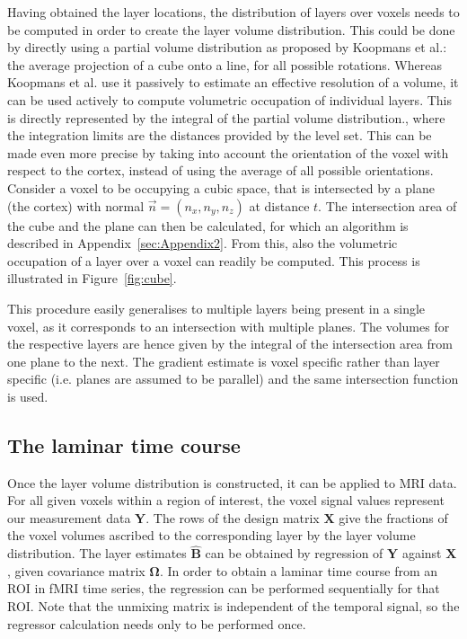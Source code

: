 Having obtained the layer locations, the distribution of layers over voxels needs to be computed in order to create the layer volume distribution. This could be done by directly using a partial volume distribution as proposed by Koopmans et al.\cite{Koopmans2011}: the average projection of a cube onto a line, for all possible rotations. Whereas Koopmans et al. \cite{Koopmans2011} use it passively to estimate an effective resolution of a volume, it can be used actively to compute volumetric occupation of individual layers. This is directly represented by the integral of the partial volume distribution., where the integration limits are the distances provided by the level set. This can be made even more precise by taking into account the orientation of the voxel with respect to the cortex, instead of using the average of all possible orientations. Consider a voxel to be occupying a cubic space, that is intersected by a plane (the cortex) with normal $\vec{n}=(n_x, n_y, n_z)$ at distance $t$. The intersection area of the cube and the plane can then be calculated, for which an algorithm is described in Appendix~\ref{sec:Appendix2}. From this, also the volumetric occupation of a layer over a voxel can readily be computed. This process is illustrated in Figure~\ref{fig:cube}.

This procedure easily generalises to multiple layers being present in a single voxel, as it corresponds to an intersection with multiple planes. The volumes for the respective layers are hence given by the integral of the intersection area from one plane to the next. The gradient estimate is voxel specific rather than layer specific (i.e. planes are assumed to be parallel) and the same intersection function is used. 

\subsection{The laminar time course}
Once the layer volume distribution is constructed, it can be applied to MRI data. For all given voxels within a region of interest, the voxel signal values represent our measurement data $\mathbf{Y}$. The rows of the design matrix $\mathbf{X}$ give the fractions of the voxel volumes ascribed to the corresponding layer by the layer volume distribution. The layer estimates $\mathbf{\hat{B}}$ can be obtained by regression of $\mathbf{Y}$ against $\mathbf{X}$, given covariance matrix $\mathbf{\Omega}$. In order to obtain a laminar time course from an ROI in fMRI time series, the regression can be performed sequentially for that ROI. Note that the unmixing matrix is independent of the temporal signal, so the regressor calculation needs only to be performed once.

